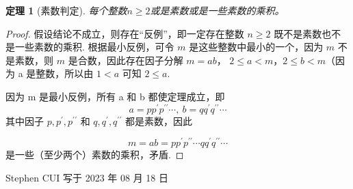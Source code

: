 \documentclass{minimal}
\newtheorem{theorem}{定理}
\begin{document}
\begin{theorem}[素数判定]
    每个整数$n\geq 2$或是素数或是一些素数的乘积。
\end{theorem}

\begin{proof}
    假设结论不成立，则存在“反例”，即一定存在整数 $n\geq 2$ 既不是素数也不是一些素数的乘积. 根据最小反例，可令 $m$ 是这些整数中最小的一个，因为 $m$ 不是素数，则 $m$ 是合数，因此存在因子分解 $m=ab$， $2 \leq a < m$，$2 \leq b < m$（因为 a 是整数，所以由 $1<a$ 可知 $2\leq a$.

    因为 m 是最小反例，所有 a 和 b 都使定理成立，即
    $$a = pp^{\prime}p^{\prime\prime}\cdots,~b = qq^{\prime}q^{\prime\prime}\cdots$$
    其中因子 $p, p^{\prime}, p^{\prime\prime}$ 和 $q, q^{\prime}, q^{\prime\prime}$ 都是素数，因此

    $$m = ab = pp^{\prime}p^{\prime\prime}\cdots qq^{\prime}q^{\prime\prime}\cdots$$
    是一些（至少两个）素数的乘积，矛盾.
\end{proof}
Stephen CUI 写于 2023 年 08 月 18 日
\end{document}
